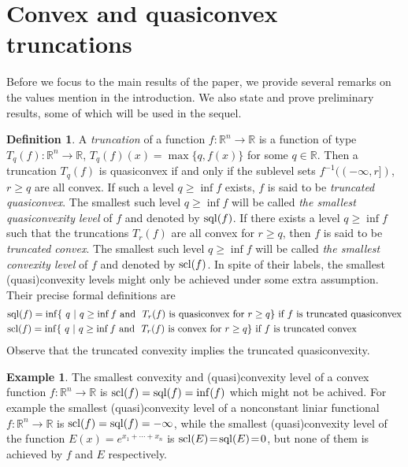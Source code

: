 \documentclass[12pt,twoside,reqno]{amsart}
\theoremstyle{definition}
\newtheorem{definition}{Definition}[section]
\newtheorem{example}{Example}[section]
\numberwithin{equation}{section}
\begin{document}
\section{Convex and quasiconvex truncations}
Before we focus to the main results of the paper, we provide several remarks on the values mention in the introduction. We also state and prove preliminary results, some of which will be used in the sequel.
\begin{definition}
A {\em truncation} of a function $f:\mathbb{R}^n\longrightarrow\mathbb{R}$ is a function of type 
$T_q(f):\mathbb{R}^n\longrightarrow\mathbb{R}$, $T_q(f)(x)=\max\{q,f(x)\}$ for some $q\in\mathbb{R}$. 
Then a truncation $T_{q}(f)$ is quasiconvex if and only if 
the sublevel sets $f^{-1}((-\infty,r])$, $r\geq q$ are all convex. If such a level $q\geq \inf f$ exists, $f$ is said to be {\em truncated quasiconvex}. 
The smallest such level $q\geq \inf f$ will be called {\em the smallest quasiconvexity level} of $f$ and denoted by ${\rm sql}(f)$.
If there exists a level $q\geq \inf f$ such that the truncations $T_{r}(f)$ are all convex for $r\geq q$, then $f$ is said to be {\em truncated convex}. 
The smallest such level $q\geq \inf f$ will be called {\em the smallest convexity level} of $f$ and denoted by ${\rm scl}(f)$.
In spite of their labels, the smallest (quasi)convexity levels might only be achieved under some extra assumption. Their precise formal definitions are
\begin{align}
& {\rm sql}(f)=\inf\{ \ q \ | \ q\geq \inf f\mbox{ and }\  T_{r}(f)\mbox{ is quasiconvex for }r\geq q\}\mbox{ if }f\mbox{ is truncated quasiconvex}\nonumber\\
& {\rm scl}(f)=\inf\{ \ q \ | \ q\geq \inf f\mbox{ and }\  T_{r}(f)\mbox{ is convex for }r\geq q\}\mbox{ if }f\mbox{ is truncated convex}\nonumber
\end{align}
Observe that the truncated convexity implies the truncated quasiconvexity.
\end{definition}
\begin{example}
The smallest convexity and (quasi)convexity level of a convex function $f:\mathbb{R}^n\longrightarrow\mathbb{R}$ is ${\rm scl}(f)={\rm sql}(f)=\inf(f)$ which might not be achived. For example the smallest (quasi)convexity level of a nonconstant liniar functional $f:\mathbb{R}^n\longrightarrow\mathbb{R}$ is 
${\rm scl}(f)={\rm sql}(f)=-\infty$, while the smallest (quasi)convexity level of the function  
$E(x)=e^{x_1+\cdots+x_n}$ is ${\rm scl}(E)\!=\!{\rm sql}(E)\!=\!0$, but none of them is achieved by $f$ and $E$ respectively.
\end{example}
\end{document}
